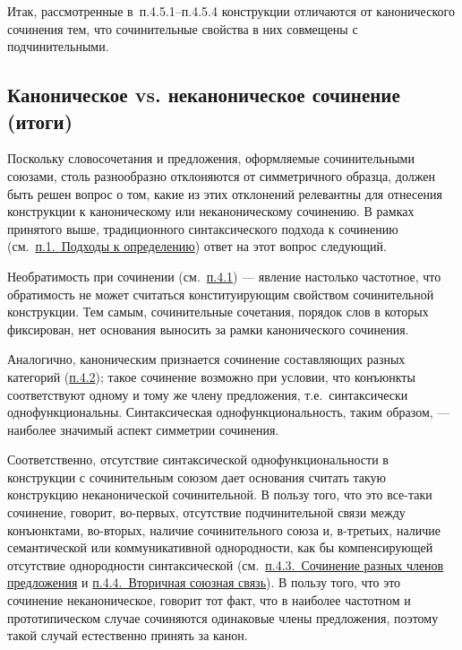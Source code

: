 Итак, рассмотренные в~п.4.5.1--п.4.5.4 конструкции отличаются от
канонического сочинения тем, что сочинительные свойства в них совмещены
с подчинительными.

\subsection{Каноническое vs. неканоническое сочинение
(итоги)}\label{ux43aux430ux43dux43eux43dux438ux447ux435ux441ux43aux43eux435-vs.-ux43dux435ux43aux430ux43dux43eux43dux438ux447ux435ux441ux43aux43eux435-ux441ux43eux447ux438ux43dux435ux43dux438ux435-ux438ux442ux43eux433ux438}

Поскольку словосочетания и предложения, оформляемые сочинительными
союзами, столь разнообразно отклоняются от симметричного образца, должен
быть решен вопрос о том, какие из этих отклонений релевантны для
отнесения конструкции к каноническому или неканоническому сочинению. В
рамках принятого выше, традиционного синтаксического подхода к сочинению
(см.~\underline{п.1.~Подходы к определению}) ответ на этот вопрос
следующий.

Необратимость при сочинении (см.~\underline{п.4.1}) --- явление настолько
частотное, что обратимость не может считаться конституирующим свойством
сочинительной конструкции. Тем самым, сочинительные сочетания, порядок
слов в которых фиксирован, нет основания выносить за рамки канонического
сочинения.

Аналогично, каноническим признается сочинение составляющих разных
категорий (\underline{п.4.2}); такое сочинение возможно при условии, что
конъюнкты соответствуют одному и тому же члену предложения,
т.е.~синтаксически однофункциональны. Синтаксическая
однофункциональность, таким образом, --- наиболее значимый аспект
симметрии сочинения.

Соответственно, отсутствие синтаксической однофункциональности в
конструкции с сочинительным союзом дает основания считать такую
конструкцию неканонической сочинительной. В пользу того, что это
все-таки сочинение, говорит, во-первых, отсутствие подчинительной связи
между конъюнктами, во-вторых, наличие сочинительного союза и, в-третьих,
наличие семантической или коммуникативной однородности, как бы
компенсирующей отсутствие однородности синтаксической
(см.~\underline{п.4.3.~Сочинение разных членов предложения} и
\underline{п.4.4.~Вторичная союзная связь}). В пользу того, что это
сочинение неканоническое, говорит тот факт, что в наиболее частотном и
прототипическом случае сочиняются одинаковые члены предложения, поэтому
такой случай естественно принять за канон.

